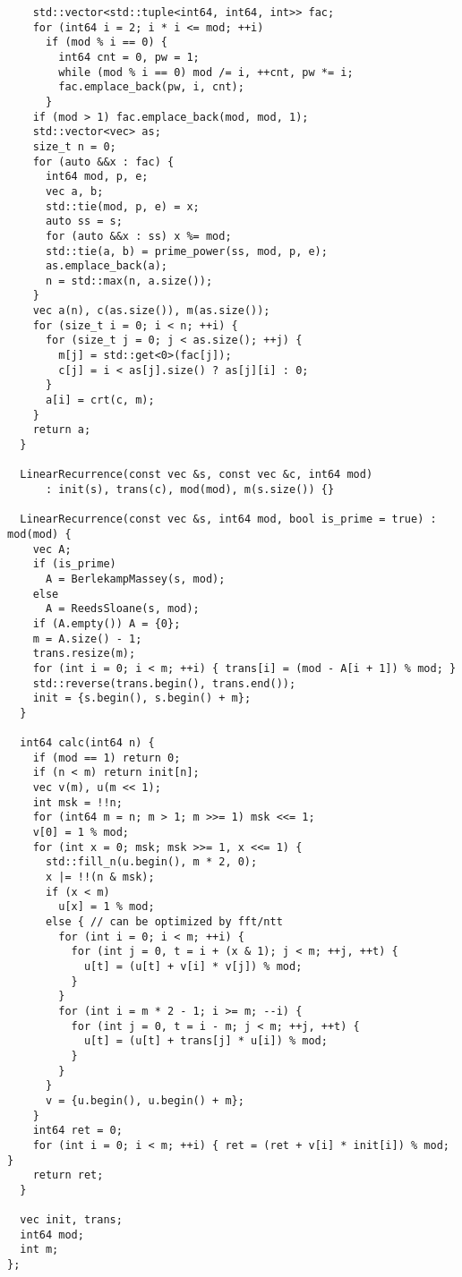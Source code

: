 \documentclass[twoside]{article}
\begin{document}
\begin{lstlisting}
    std::vector<std::tuple<int64, int64, int>> fac;
    for (int64 i = 2; i * i <= mod; ++i)
      if (mod % i == 0) {
        int64 cnt = 0, pw = 1;
        while (mod % i == 0) mod /= i, ++cnt, pw *= i;
        fac.emplace_back(pw, i, cnt);
      }
    if (mod > 1) fac.emplace_back(mod, mod, 1);
    std::vector<vec> as;
    size_t n = 0;
    for (auto &&x : fac) {
      int64 mod, p, e;
      vec a, b;
      std::tie(mod, p, e) = x;
      auto ss = s;
      for (auto &&x : ss) x %= mod;
      std::tie(a, b) = prime_power(ss, mod, p, e);
      as.emplace_back(a);
      n = std::max(n, a.size());
    }
    vec a(n), c(as.size()), m(as.size());
    for (size_t i = 0; i < n; ++i) {
      for (size_t j = 0; j < as.size(); ++j) {
        m[j] = std::get<0>(fac[j]);
        c[j] = i < as[j].size() ? as[j][i] : 0;
      }
      a[i] = crt(c, m);
    }
    return a;
  }

  LinearRecurrence(const vec &s, const vec &c, int64 mod)
      : init(s), trans(c), mod(mod), m(s.size()) {}

  LinearRecurrence(const vec &s, int64 mod, bool is_prime = true) : mod(mod) {
    vec A;
    if (is_prime)
      A = BerlekampMassey(s, mod);
    else
      A = ReedsSloane(s, mod);
    if (A.empty()) A = {0};
    m = A.size() - 1;
    trans.resize(m);
    for (int i = 0; i < m; ++i) { trans[i] = (mod - A[i + 1]) % mod; }
    std::reverse(trans.begin(), trans.end());
    init = {s.begin(), s.begin() + m};
  }

  int64 calc(int64 n) {
    if (mod == 1) return 0;
    if (n < m) return init[n];
    vec v(m), u(m << 1);
    int msk = !!n;
    for (int64 m = n; m > 1; m >>= 1) msk <<= 1;
    v[0] = 1 % mod;
    for (int x = 0; msk; msk >>= 1, x <<= 1) {
      std::fill_n(u.begin(), m * 2, 0);
      x |= !!(n & msk);
      if (x < m)
        u[x] = 1 % mod;
      else { // can be optimized by fft/ntt
        for (int i = 0; i < m; ++i) {
          for (int j = 0, t = i + (x & 1); j < m; ++j, ++t) {
            u[t] = (u[t] + v[i] * v[j]) % mod;
          }
        }
        for (int i = m * 2 - 1; i >= m; --i) {
          for (int j = 0, t = i - m; j < m; ++j, ++t) {
            u[t] = (u[t] + trans[j] * u[i]) % mod;
          }
        }
      }
      v = {u.begin(), u.begin() + m};
    }
    int64 ret = 0;
    for (int i = 0; i < m; ++i) { ret = (ret + v[i] * init[i]) % mod; }
    return ret;
  }

  vec init, trans;
  int64 mod;
  int m;
};

\end{lstlisting}
\end{document}
